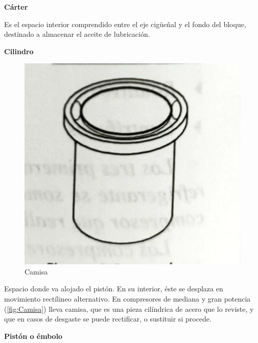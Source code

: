 \textbf{C\'arter}

Es el espacio interior comprendido entre el eje cig\"ue\~{n}al y el fondo del bloque, destinado a almacenar el aceite de lubricación.

\textbf{Cilindro}
\begin{figure}
	\centering
	\includegraphics[width=.5\linewidth]{figuras/compresores/cilindro con camisa.jpg}
	\caption{Camisa}
	\label{fig:Camisa}
\end{figure}
Espacio donde va alojado el pist\'on. En su interior, \'este se desplaza en movimiento rect\'ilineo alternativo. En compresores de mediana y gran potencia (\autoref{fig:Camisa}) lleva camisa, que es una pieza cil\'indrica de acero que lo reviste, y que en casos de desgaste se puede rectificar, o sustituir si procede.

\textbf{Pist\'on o \'embolo}

